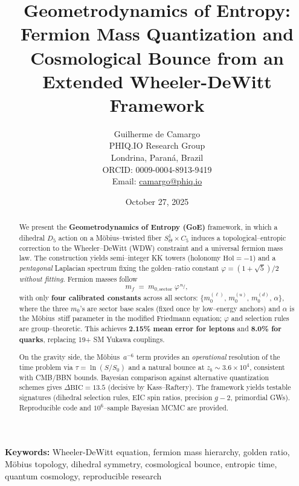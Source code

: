 \documentclass[12pt]{article}
\title{Geometrodynamics of Entropy: Fermion Mass Quantization and Cosmological Bounce from an Extended Wheeler-DeWitt Framework}
\author{Guilherme de Camargo\\
PHIQ.IO Research Group\\
Londrina, Paraná, Brazil\\
ORCID: 0009-0004-8913-9419\\
Email: \href{mailto:camargo@phiq.io}{camargo@phiq.io}}
\date{October 27, 2025}
\newcommand{\Moebius}{M\"obius}
\newcommand{\SigMoeb}{\Sigma\text{--}\Moebius}
\begin{document}
\maketitle

\begin{abstract}
We present the \textbf{Geometrodynamics of Entropy (GoE)} framework, in which a dihedral $D_5$ action on a M\"obius--twisted fiber $S^1_\Theta \times C_5$ induces a topological--entropic correction to the Wheeler--DeWitt (WDW) constraint and a universal fermion mass law. The construction yields semi--integer KK towers (holonomy $\mathrm{Hol}=-1$) and a \emph{pentagonal} Laplacian spectrum fixing the golden--ratio constant $\varphi=(1+\sqrt{5})/2$ \emph{without fitting}. Fermion masses follow
\[
m_f \;=\; m_{0,\text{sector}}\;\varphi^{\,n_f},
\]
with only \textbf{four calibrated constants} across all sectors:
$\{m_{0}^{(\ell)},\,m_{0}^{(u)},\,m_{0}^{(d)},\,\alpha\}$, where the three $m_0$'s are sector base scales (fixed once by low--energy anchors) and $\alpha$ is the \SigMoeb\ stiff parameter in the modified Friedmann equation; $\varphi$ and selection rules are group--theoretic. This achieves \textbf{2.15\% mean error for leptons} and \textbf{8.0\% for quarks}, replacing 19+ SM Yukawa couplings. 

On the gravity side, the \SigMoeb\ $a^{-6}$ term provides an \emph{operational} resolution of the time problem via $\tau=\ln(S/S_0)$ and a natural bounce at $z_b \sim 3.6\times 10^4$, consistent with CMB/BBN bounds. Bayesian comparison against alternative quantization schemes gives $\Delta\mathrm{BIC}=13.5$ (decisive by Kass--Raftery). The framework yields testable signatures (dihedral selection rules, EIC spin ratios, precision $g-2$, primordial GWs). Reproducible code and $10^6$--sample Bayesian MCMC are provided.
\end{abstract}

\textbf{Keywords:} Wheeler-DeWitt equation, fermion mass hierarchy, golden ratio, M\"obius topology, dihedral symmetry, cosmological bounce, entropic time, quantum cosmology, reproducible research
\end{document}

